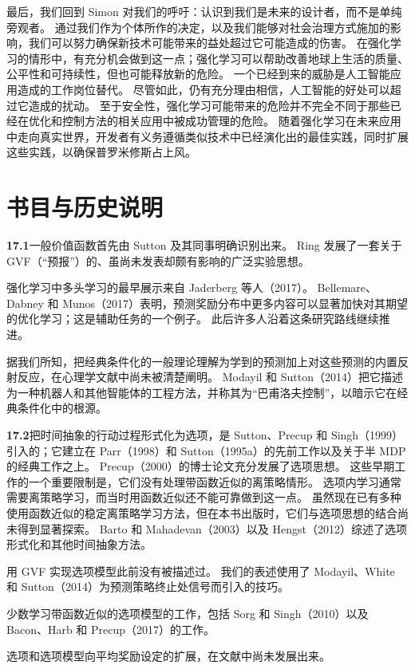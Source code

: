 \documentclass[UTF8,12pt,a4paper,fontset=fandol]{ctexart}
\begin{document}
最后，我们回到 Simon 对我们的呼吁：认识到我们是未来的设计者，而不是单纯旁观者。
通过我们作为个体所作的决定，以及我们能够对社会治理方式施加的影响，我们可以努力确保新技术可能带来的益处超过它可能造成的伤害。
在强化学习的情形中，有充分机会做到这一点；强化学习可以帮助改善地球上生活的质量、公平性和可持续性，但也可能释放新的危险。
一个已经到来的威胁是人工智能应用造成的工作岗位替代。
尽管如此，仍有充分理由相信，人工智能的好处可以超过它造成的扰动。
至于安全性，强化学习可能带来的危险并不完全不同于那些已经在优化和控制方法的相关应用中被成功管理的危险。
随着强化学习在未来应用中走向真实世界，开发者有义务遵循类似技术中已经演化出的最佳实践，同时扩展这些实践，以确保普罗米修斯占上风。

\section*{书目与历史说明}

\noindent\textbf{17.1}\quad 一般价值函数首先由 Sutton 及其同事明确识别出来。
Ring 发展了一套关于 GVF（“预报”）的、虽尚未发表却颇有影响的广泛实验思想。

强化学习中多头学习的最早展示来自 Jaderberg 等人（2017）。
Bellemare、Dabney 和 Munos（2017）表明，预测奖励分布中更多内容可以显著加快对其期望的优化学习；这是辅助任务的一个例子。
此后许多人沿着这条研究路线继续推进。

据我们所知，把经典条件化的一般理论理解为学到的预测加上对这些预测的内置反射反应，在心理学文献中尚未被清楚阐明。
Modayil 和 Sutton（2014）把它描述为一种机器人和其他智能体的工程方法，并称其为“巴甫洛夫控制”，以暗示它在经典条件化中的根源。

\noindent\textbf{17.2}\quad 把时间抽象的行动过程形式化为选项，是 Sutton、Precup 和 Singh（1999）引入的；它建立在 Parr（1998）和 Sutton（1995a）的先前工作以及关于半 MDP 的经典工作之上。
Precup（2000）的博士论文充分发展了选项思想。
这些早期工作的一个重要限制是，它们没有处理带函数近似的离策略情形。
选项内学习通常需要离策略学习，而当时用函数近似还不能可靠做到这一点。
虽然现在已有多种使用函数近似的稳定离策略学习方法，但在本书出版时，它们与选项思想的结合尚未得到显著探索。
Barto 和 Mahadevan（2003）以及 Hengst（2012）综述了选项形式化和其他时间抽象方法。

用 GVF 实现选项模型此前没有被描述过。
我们的表述使用了 Modayil、White 和 Sutton（2014）为预测策略终止处信号而引入的技巧。

少数学习带函数近似的选项模型的工作，包括 Sorg 和 Singh（2010）以及 Bacon、Harb 和 Precup（2017）的工作。

选项和选项模型向平均奖励设定的扩展，在文献中尚未发展出来。
\end{document}
